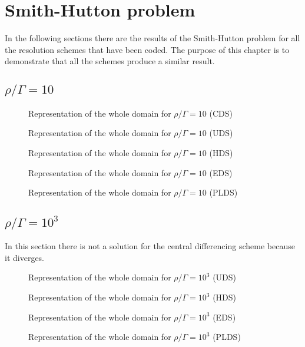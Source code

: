 \chapter{Smith-Hutton problem}
In the following sections there are the results of the Smith-Hutton problem for all the resolution schemes that have been coded. The purpose of this chapter is to demonstrate that all the schemes produce a similar result.

\section{$\rho/\Gamma=10$}
\begin{figure}[H]
	\centering
	
	\caption{Representation of the whole domain for $\rho/\Gamma=10$ (CDS)}
\end{figure}
\begin{figure}[H]
	\centering
	
	\caption{Representation of the whole domain for $\rho/\Gamma=10$ (UDS)}
\end{figure}
\begin{figure}[H]
	\centering
	
	\caption{Representation of the whole domain for $\rho/\Gamma=10$ (HDS)}
\end{figure}
\begin{figure}[H]
	\centering
	
	\caption{Representation of the whole domain for $\rho/\Gamma=10$ (EDS)}
\end{figure}
\begin{figure}[H]
	\centering
	
	\caption{Representation of the whole domain for $\rho/\Gamma=10$ (PLDS)}
\end{figure}

\section{$\rho/\Gamma=10^{3}$}
In this section there is not a solution for the central differencing scheme because it diverges.
\begin{figure}[H]
	\centering
	
	\caption{Representation of the whole domain for $\rho/\Gamma=10^{3}$ (UDS)}
\end{figure}
\begin{figure}[H]
	\centering
	
	\caption{Representation of the whole domain for $\rho/\Gamma=10^{3}$ (HDS)}
\end{figure}
\begin{figure}[H]
	\centering
	
	\caption{Representation of the whole domain for $\rho/\Gamma=10^{3}$ (EDS)}
\end{figure}
\begin{figure}[H]
	\centering
	
	\caption{Representation of the whole domain for $\rho/\Gamma=10^{3}$ (PLDS)}
\end{figure}

